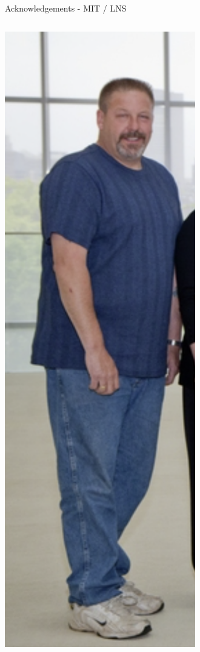 \documentclass[aspectratio=169]{beamer}
\begin{document}
\begin{frame}{Acknowledgements - MIT / LNS}
\begin{columns}
            \includegraphics[width=0.99\textwidth]{people/lns/jack.png}
        \centering
            

\end{columns}
\end{frame}
\end{document}
